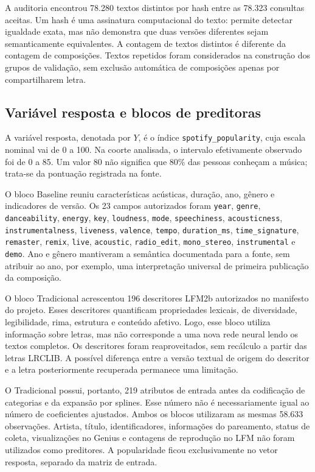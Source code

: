 A auditoria encontrou 78.280 textos distintos por hash entre as 78.323 consultas aceitas. Um hash é uma assinatura computacional do texto: permite detectar igualdade exata, mas não demonstra que duas versões diferentes sejam semanticamente equivalentes. A contagem de textos distintos é diferente da contagem de composições. Textos repetidos foram considerados na construção dos grupos de validação, sem exclusão automática de composições apenas por compartilharem letra.

\subsection{Variável resposta e blocos de preditoras}

A variável resposta, denotada por $Y$, é o índice \texttt{spotify\_popularity}, cuja escala nominal vai de 0 a 100. Na coorte analisada, o intervalo efetivamente observado foi de 0 a 85. Um valor 80 não significa que 80\% das pessoas conheçam a música; trata-se da pontuação registrada na fonte.

O bloco Baseline reuniu características acústicas, duração, ano, gênero e indicadores de versão. Os 23 campos autorizados foram \texttt{year}, \texttt{genre}, \texttt{danceability}, \texttt{energy}, \texttt{key}, \texttt{loudness}, \texttt{mode}, \texttt{speechiness}, \texttt{acousticness}, \texttt{instrumentalness}, \texttt{liveness}, \texttt{valence}, \texttt{tempo}, \texttt{duration\_ms}, \texttt{time\_signature}, \texttt{remaster}, \texttt{remix}, \texttt{live}, \texttt{acoustic}, \texttt{radio\_edit}, \texttt{mono\_stereo}, \texttt{instrumental} e \texttt{demo}. Ano e gênero mantiveram a semântica documentada para a fonte, sem atribuir ao ano, por exemplo, uma interpretação universal de primeira publicação da composição.

O bloco Tradicional acrescentou 196 descritores LFM2b autorizados no manifesto do projeto. Esses descritores quantificam propriedades lexicais, de diversidade, legibilidade, rima, estrutura e conteúdo afetivo. Logo, esse bloco utiliza informação sobre letras, mas não corresponde a uma nova rede neural lendo os textos completos. Os descritores foram reaproveitados, sem recálculo a partir das letras LRCLIB. A possível diferença entre a versão textual de origem do descritor e a letra posteriormente recuperada permanece uma limitação.

O Tradicional possui, portanto, 219 atributos de entrada antes da codificação de categorias e da expansão por splines. Esse número não é necessariamente igual ao número de coeficientes ajustados. Ambos os blocos utilizaram as mesmas 58.633 observações. Artista, título, identificadores, informações do pareamento, status de coleta, visualizações no Genius e contagens de reprodução no LFM não foram utilizados como preditores. A popularidade ficou exclusivamente no vetor resposta, separado da matriz de entrada.

